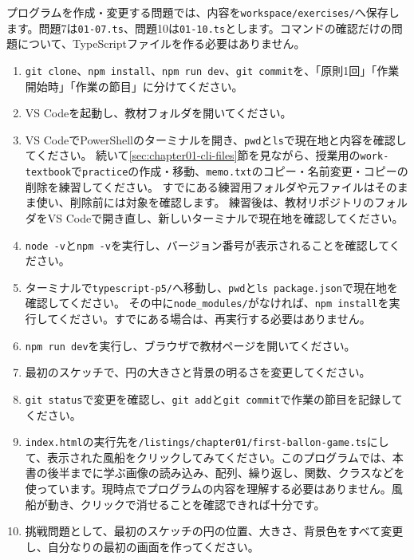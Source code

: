 プログラムを作成・変更する問題では、内容を\texttt{workspace/exercises/}へ保存します。問題7は\texttt{01-07.ts}、問題10は\texttt{01-10.ts}とします。コマンドの確認だけの問題について、TypeScriptファイルを作る必要はありません。

\begin{enumerate}
    \item \texttt{git clone}、\texttt{npm install}、\texttt{npm run dev}、\texttt{git commit}を、「原則1回」「作業開始時」「作業の節目」に分けてください。
    \item VS Codeを起動し、教材フォルダを開いてください。
    \item VS CodeでPowerShellのターミナルを開き、\texttt{pwd}と\texttt{ls}で現在地と内容を確認してください。
    続いて\ref{sec:chapter01-cli-files}節を見ながら、授業用の\texttt{work-textbook}で\texttt{practice}の作成・移動、\texttt{memo.txt}のコピー・名前変更・コピーの削除を練習してください。
    すでにある練習用フォルダや元ファイルはそのまま使い、削除前には対象を確認します。
    練習後は、教材リポジトリのフォルダをVS Codeで開き直し、新しいターミナルで現在地を確認してください。
    \item \texttt{node -v}と\texttt{npm -v}を実行し、バージョン番号が表示されることを確認してください。
    \item ターミナルで\texttt{typescript-p5/}へ移動し、\texttt{pwd}と\texttt{ls package.json}で現在地を確認してください。
    その中に\texttt{node\_modules/}がなければ、\texttt{npm install}を実行してください。すでにある場合は、再実行する必要はありません。
    \item \texttt{npm run dev}を実行し、ブラウザで教材ページを開いてください。
    \item 最初のスケッチで、円の大きさと背景の明るさを変更してください。
    \item \texttt{git status}で変更を確認し、\texttt{git add}と\texttt{git commit}で作業の節目を記録してください。
    \item \texttt{index.html}の実行先を\texttt{/listings/chapter01/first-ballon-game.ts}にして、表示された風船をクリックしてみてください。このプログラムでは、本書の後半までに学ぶ画像の読み込み、配列、繰り返し、関数、クラスなどを使っています。現時点でプログラムの内容を理解する必要はありません。風船が動き、クリックで消せることを確認できれば十分です。
    \item 挑戦問題として、最初のスケッチの円の位置、大きさ、背景色をすべて変更し、自分なりの最初の画面を作ってください。
\end{enumerate}

